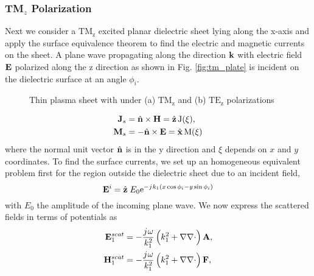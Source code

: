\subsubsection{TM$_z$ Polarization}
%
Next we consider a $\mathrm{TM_z}$ excited planar dielectric sheet lying along the x-axis and apply the surface equivalence theorem to find the electric and magnetic currents on the sheet. A plane wave propagating along the direction $\mathbf{k}$ with electric field $\mathbf{E}$ polarized along the z direction as shown in Fig. \ref{fig:tm_plate} is incident on the dielectric surface at an angle $\phi_i$.
%
\begin{figure}[b!]
  \centering
   \hfil
  \caption{Thin plasma sheet with under (a) $\mathrm{TM_z}$ and (b) $\mathrm{TE_z}$ polarizations}
  \label{fig:thinsheets}
\end{figure}
%
\begin{subequations}
  \begin{align}
    \mathbf{J}_s &=  \hat{\mathbf{n}} \times \mathbf{H} = \hat {\mathbf{z}} \, \mathrm{J(\xi)},
    \label{eq:J_s}\\
    \mathbf{M}_s &=  -\hat{\mathbf{n}} \times \mathbf{E} = \hat {\mathbf{x}} \, \mathrm{M(\xi)}
    \label{eq:M_s}
  \end{align}
  \label{eq:eq_currents}%
\end{subequations}%
%
where the normal unit vector $\hat{\mathbf{n}}$ is in the y direction and $\xi$ depends on $x$ and $y$ coordinates. To find the surface currents, we set up an homogeneous equivalent problem first for the region outside the dielectric sheet due to an incident field,
%
\begin{equation}
  \mathbf{E}^i = \hat{\mathbf{z}} \; E_0  \mathrm{e}^{-{j}\mkern1mu k_1 (x \cos \phi_i - y \sin \phi_i)}
  \label{eq:E_i}
\end{equation}
%
with $E_0$ the amplitude of the incoming plane wave. We now express the scattered fields in terms of potentials as
%
\begin{subequations}
  \begin{align}
    \mathbf{E}_1^{scat} &=  -\frac{{j}\mkern1mu \omega}{k_1^2}\left( k_1^2 + \nabla \nabla \cdot \right) \mathbf{A},
    \label{eq:E1scat}\\
    \mathbf{H}_1^{scat} &=  -\frac{{j}\mkern1mu \omega}{k_1^2}\left( k_1^2 + \nabla \nabla \cdot \right) \mathbf{F},
    \label{eq:H1scat}
  \end{align}
  \label{eq:1scat_pot}%
\end{subequations}%

